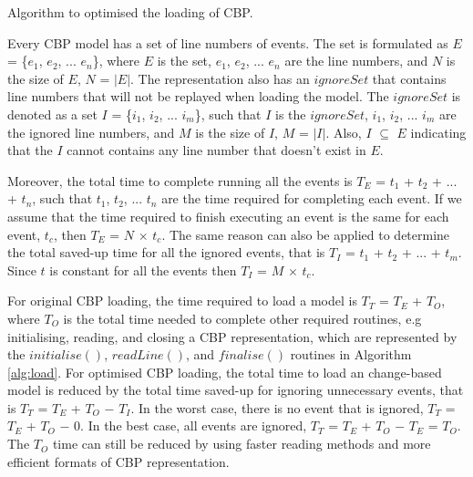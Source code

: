\documentclass{llncs}
\begin{document}
\begin{algorithm}[H]
    \begin{small}
    \end{small}
    \caption{Algorithm to optimised the loading of CBP.}
    \label{alg:load}
\end{algorithm}

Every CBP model has a set of line numbers of events. The set is formulated as $E$ = \{$e_1$, $e_2$, ... $e_n$\}, where $E$ is the set, $e_1$, $e_2$, ... $e_n$ are the line numbers, and $N$ is the size of $E$, $N$ = $|E|$. The representation also has an $ignoreSet$ that contains line numbers that will not be replayed when loading the model. The $ignoreSet$ is denoted as a set $I$  = \{$i_1$, $i_2$, ... $i_m$\}, such that $I$ is the $ignoreSet$, $i_1$, $i_2$, ... $i_m$ are the ignored line numbers, and $M$ is the size of $I$, $M$ = $|I|$. Also, $I$ $\subseteq$ $E$ indicating that the $I$ cannot contains any line number that doesn't exist in $E$.

Moreover, the total time to complete running all the events is $T_E$ = $t_1$ + $t_2$ + ... + $t_n$, such that $t_1$, $t_2$, ... $t_n$ are the time required for completing each event. If we assume that the time required to finish executing an event is the same for each event, $t_c$, then $T_E$ = $N$ $\times$ $t_c$. The same reason can also be applied to determine the total saved-up time for all the ignored events, that is $T_I$ = $t_1$ + $t_2$ + ... + $t_m$. Since $t$ is constant for all the events then $T_I$ = $M$ $\times$ $t_c$.

For original CBP loading, the time required to load a model is $T_T$ = $T_E$ + $T_O$, where $T_O$ is the total time needed to complete other required routines, e.g initialising, reading, and closing a CBP representation, which are represented by the $initialise()$, $readLine()$, and $finalise()$ routines in Algorithm \ref{alg:load}. For optimised CBP loading, the total time to load an change-based model is reduced by the total time saved-up for ignoring unnecessary events, that is $T_T$ = $T_E$ + $T_O$ $-$ $T_I$. In the worst case, there is no event that is ignored, $T_T$ = $T_E$ + $T_O$ $-$ 0. In the best case, all events are ignored, $T_T$ = $T_E$ + $T_O$ $-$ $T_E$ = $T_O$. The $T_O$ time can still be reduced by using faster reading methods and more efficient formats of CBP representation. 
\end{document}

